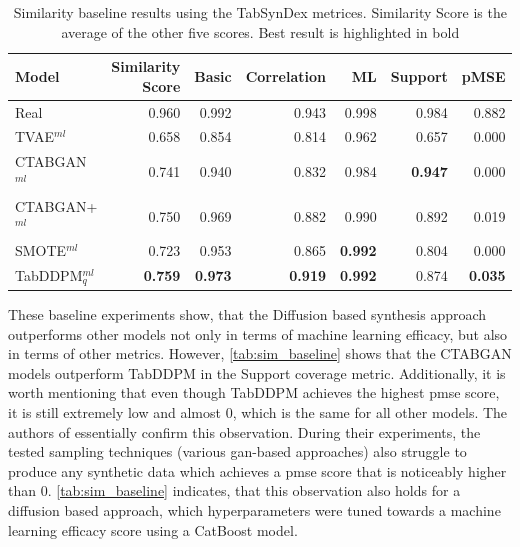 \begin{table}[h]
	\centering
	\begin{tabular}{lrrrrrr}
		\toprule
		\textbf{Model}     & \textbf{Similarity Score} & \textbf{Basic} & \textbf{Correlation} & \textbf{ML}    & \textbf{Support} & \textbf{pMSE}  \\
		\midrule
		Real               & 0.960                     & 0.992          & 0.943                & 0.998          & 0.984            & 0.882          \\
		TVAE$^{ml}$        & 0.658                     & 0.854          & 0.814                & 0.962          & 0.657            & 0.000          \\
		CTABGAN$^{ml}$     & 0.741                     & 0.940          & 0.832                & 0.984          & \textbf{0.947}   & 0.000          \\
		CTABGAN+$^{ml}$    & 0.750                     & 0.969          & 0.882                & 0.990          & 0.892            & 0.019          \\
		SMOTE$^{ml}$       & 0.723                     & 0.953          & 0.865                & \textbf{0.992} & 0.804            & 0.000          \\
		TabDDPM$^{ml}_{q}$ & \textbf{0.759}            & \textbf{0.973} & \textbf{0.919}       & \textbf{0.992} & 0.874            & \textbf{0.035} \\
		\bottomrule
	\end{tabular}
	\caption[Similarity baseline]{Similarity baseline results using the TabSynDex metrices. Similarity Score is the average of the other five scores. Best result is highlighted in bold}
	\label{tab:sim_baseline}
\end{table}

These baseline experiments show, that the Diffusion based synthesis approach outperforms other models not only in terms of machine learning efficacy, but also in terms of other metrics.
However, \autoref{tab:sim_baseline} shows that the CTABGAN models outperform TabDDPM in the Support coverage metric.
Additionally, it is worth mentioning that even though TabDDPM achieves the highest \gls{pmse} score, it is still extremely low and almost 0, which is the same for all other models.
The authors of \cite{chundawat2022UniversalMetricRobust} essentially confirm this observation.
During their experiments, the tested sampling techniques (various \gls{gan}-based approaches) also struggle to produce any synthetic data which achieves a \gls{pmse} score that is noticeably higher than 0.
\autoref{tab:sim_baseline} indicates, that this observation also holds for a diffusion based approach, which hyperparameters were tuned towards a machine learning efficacy score using a CatBoost model.

